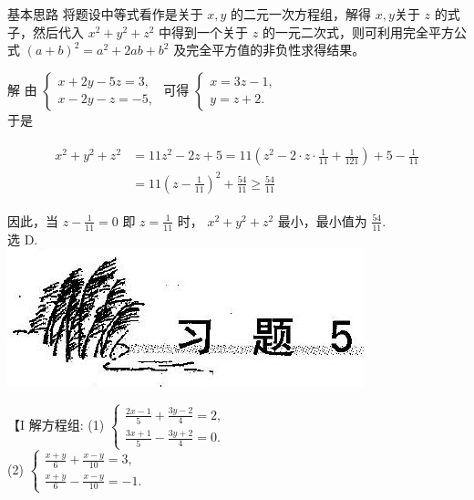 \documentclass[10pt]{article}
\begin{document}
基本思路 将题设中等式看作是关于 $x, y$ 的二元一次方程组，解得 $x, y$关于 $z$ 的式子，然后代入 $x^{2}+y^{2}+z^{2}$ 中得到一个关于 $z$ 的一元二次式，则可利用完全平方公式 $(a+b)^{2}=a^{2}+2 a b+b^{2}$ 及完全平方值的非负性求得结果。

解 由 $\left\{\begin{array}{l}x+2 y-5 z=3, \\ x-2 y-z=-5,\end{array}\right.$ 可得 $\left\{\begin{array}{l}x=3 z-1, \\ y=z+2 .\end{array}\right.$\\
于是

\begin{align*}
\begin{aligned}
x^{2}+y^{2}+z^{2} & =11 z^{2}-2 z+5=11\left(z^{2}-2 \cdot z \cdot \frac{1}{11}+\frac{1}{121}\right)+5-\frac{1}{11} \\
& =11\left(z-\frac{1}{11}\right)^{2}+\frac{54}{11} \geqslant \frac{54}{11}
\end{aligned}
\end{align*}

因此，当 $z-\frac{1}{11}=0$ 即 $z=\frac{1}{11}$ 时， $x^{2}+y^{2}+z^{2}$ 最小，最小值为 $\frac{54}{11}$.\\
选 D.\\
\includegraphics[max width=\textwidth, center]{2024_10_30_26b590fd1106d28139f0g-029}

【I 解方程组: (1) $\left\{\begin{array}{l}\frac{2 x-1}{5}+\frac{3 y-2}{4}=2, \\ \frac{3 x+1}{5}-\frac{3 y+2}{4}=0 .\end{array}\right.$\\
(2) $\left\{\begin{array}{l}\frac{x+y}{6}+\frac{x-y}{10}=3, \\ \frac{x+y}{6}-\frac{x-y}{10}=-1 .\end{array}\right.$
\end{document}
